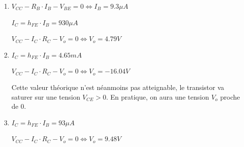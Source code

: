 \documentclass{../../template/tp}
\begin{document}
{
\begin{enumerate}
    \item $V_{CC} - R_B \cdot I_B - V_{BE} = 0 \Leftrightarrow I_B = 9.3 \mu A$

    $I_C = h_{FE} \cdot I_B = 930 \mu A$

    $V_{CC} - I_C \cdot R_C - V_o = 0 \Leftrightarrow V_o = 4.79 V$

    \item $I_C = h_{FE} \cdot I_B = 4.65 mA$

    $V_{CC} - I_C \cdot R_C - V_o = 0 \Leftrightarrow V_o = -16.04 V$

    Cette valeur théorique n'est néanmoins pas atteignable, le transistor va saturer sur une tension $V_{CE} > 0$. En pratique, on aura une tension $V_o$ proche de 0.

    \item $I_C = h_{FE} \cdot I_B = 93 \mu A$

    $V_{CC} - I_C \cdot R_C - V_o = 0 \Leftrightarrow V_o = 9.48 V$
\end{enumerate}

}
\end{document}
